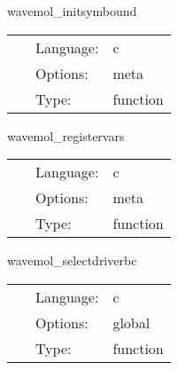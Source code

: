 \vspace{5mm}


\hspace{5mm} wavemol\_initsymbound 

\hspace{5mm}{\it schedule symmetries } 


\hspace{5mm}

 \begin{tabular*}{160mm}{cll} 
~ & Language:  & c \\ 
~ & Options:  & meta \\ 
~ & Type:  & function \\ 
\end{tabular*} 


\vspace{5mm}


\hspace{5mm} wavemol\_registervars 

\hspace{5mm}{\it register variables for mol } 


\hspace{5mm}

 \begin{tabular*}{160mm}{cll} 
~ & Language:  & c \\ 
~ & Options:  & meta \\ 
~ & Type:  & function \\ 
\end{tabular*} 


\vspace{5mm}


\hspace{5mm} wavemol\_selectdriverbc 

\hspace{5mm}{\it choose boundary condtion for driver to apply } 


\hspace{5mm}

 \begin{tabular*}{160mm}{cll} 
~ & Language:  & c \\ 
~ & Options:  & global \\ 
~ & Type:  & function \\ 
\end{tabular*} 



